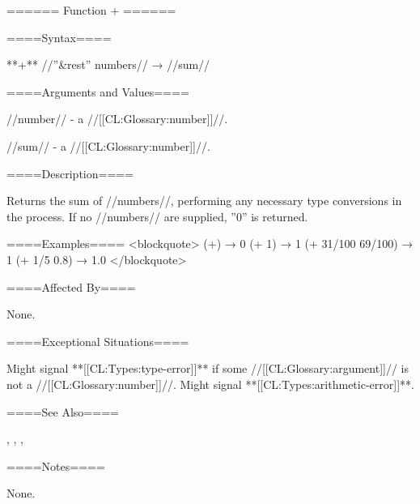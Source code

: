 ====== Function + ======

====Syntax====

**+** //''&rest'' numbers// → //sum//

====Arguments and Values====

//number// - a //[[CL:Glossary:number]]//.

//sum// - a //[[CL:Glossary:number]]//.

====Description====

Returns the sum of //numbers//, performing any necessary type conversions in the process. If no //numbers// are supplied, ''0'' is returned.

====Examples==== <blockquote> (+) → 0 (+ 1) → 1 (+ 31/100 69/100) → 1 (+ 1/5 0.8) → 1.0 </blockquote>

====Affected By====

None.

====Exceptional Situations====

Might signal **[[CL:Types:type-error]]** if some //[[CL:Glossary:argument]]// is not a //[[CL:Glossary:number]]//. Might signal **[[CL:Types:arithmetic-error]]**.

====See Also====

{\secref\NumericOperations}, {\secref\RationalComputations}, {\secref\FloatingPointComputations}, {\secref\ComplexComputations}

====Notes====

None.

